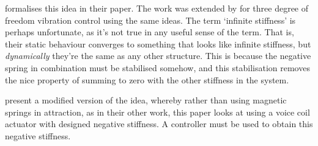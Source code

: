 \textcite{xing2005} formalises this idea in their paper.
The work was extended by \textcite{hoque2006} for three degree of freedom vibration control using the same ideas.
The term `infinite stiffness' is perhaps unfortunate, as it's not true in any useful sense of the term.
That is, their static behaviour converges to something that looks like infinite stiffness, but \emph{dynamically} they're the same as any other structure.
This is because the negative spring in combination must be stabilised somehow, and this stabilisation removes the nice property of summing to zero with the other stiffness in the system.

\textcite{mizuno2003c} present a modified version of the idea, whereby rather than using magnetic springs in attraction, as in their other work, this paper looks at using a voice coil actuator with designed negative stiffness.
A controller must be used to obtain this negative stiffness.

